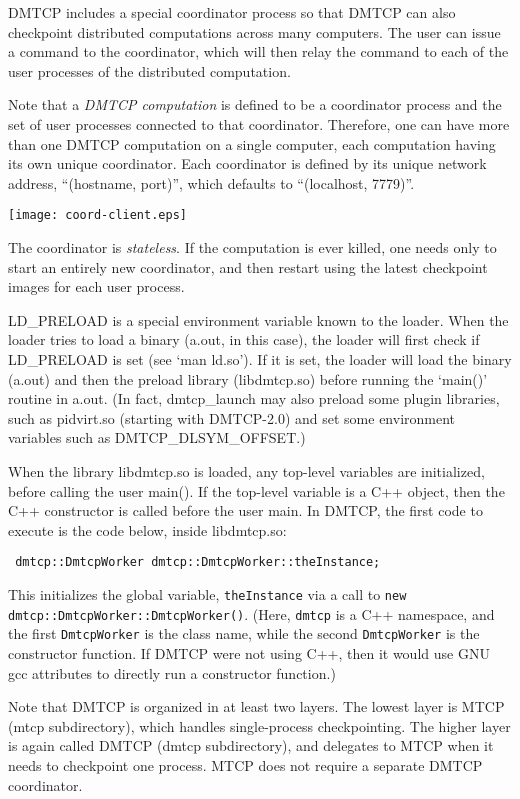\documentclass{article}
\begin{document}
DMTCP includes a special coordinator process so that DMTCP can also checkpoint
distributed computations across many computers.  The user can issue a command
to the coordinator, which will then relay the command to each of
the user processes of the distributed computation.

Note that a {\em DMTCP computation} is defined to be a coordinator process
and the set of user processes connected to that coordinator.  Therefore,
one can have more than one DMTCP computation on a single computer,
each computation having its own unique coordinator.  Each coordinator
is defined by its unique network address, ``(hostname, port)'', which
defaults to ``(localhost, 7779)''.

\begin{center}
\texttt{[image: coord-client.eps]}
\end{center}

The coordinator is {\em stateless}.  If the computation is ever killed,
one needs only to start an entirely new coordinator, and then restart
using the latest checkpoint images for each user process.

LD\_PRELOAD is a special environment variable known to the loader.
When the loader tries to load a binary (a.out, in this case), the loader
will first check if LD\_PRELOAD is set (see `man ld.so').  If it is
set, the loader will load the binary (a.out) and then the preload library
(libdmtcp.so) before running the `main()' routine in a.out.
(In fact, dmtcp\_launch may also preload some plugin libraries,
 such as pidvirt.so (starting with DMTCP-2.0) and set some
 environment variables such as DMTCP\_DLSYM\_OFFSET.)

When the library libdmtcp.so is loaded, any top-level variables
are initialized, before calling the user main().  If the top-level variable
is a C++ object, then the C++ constructor is called before the
user main.  In DMTCP, the first code to execute is the code
below, inside libdmtcp.so:

{\tt
dmtcp::DmtcpWorker dmtcp::DmtcpWorker::theInstance;
}

This initializes the global variable, {\tt theInstance} via a call
to {\tt new dmtcp::DmtcpWorker::DmtcpWorker()}.  (Here, {\tt dmtcp}
is a C++ namespace, and the first {\tt DmtcpWorker} is the class name,
while the second {\tt DmtcpWorker} is the constructor function.  If DMTCP were
not using C++, then it would use GNU gcc attributes
to directly run a constructor function.)

Note that DMTCP is organized in at least two layers.  The lowest layer
is MTCP (mtcp subdirectory), which handles single-process checkpointing.
The higher layer is again called DMTCP (dmtcp subdirectory), and delegates
to MTCP when it needs to checkpoint one process.  MTCP does not require
a separate DMTCP coordinator.
\end{document}
